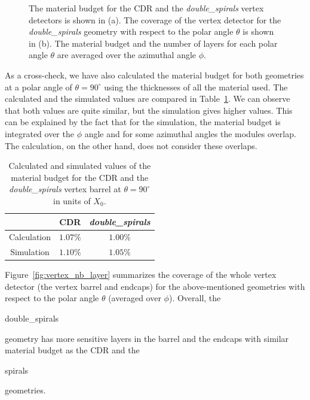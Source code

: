 \begin{figure}[H]
\begin{subfigure}[b]{0.5\textwidth}
    \caption{}\label{fig:double_nb_barrel_endcap}
  \end{subfigure}
  \caption{The material budget for the CDR and the {\it double\_spirals} vertex detectors is shown in (a). The coverage of the vertex detector for the {\it double\_spirals} geometry with respect to the polar angle $\theta$ is shown in (b). The material budget and the number of layers for each polar angle $\theta$ are averaged over the azimuthal angle $\phi$.}
\end{figure}

\newpage
As a cross-check, we have also calculated the material budget for both geometries at a polar angle of $\theta = 90^{\circ}$ using the thicknesses of all the material used. The calculated and the simulated values are compared in Table~\ref{tab:material_budg_DL_table}. We can observe that both values are quite similar, but the simulation gives higher values. This can be explained by the fact that for the simulation, the material budget is integrated over the $\phi$ angle and for some azimuthal angles the modules overlap. The calculation, on the other hand, does not consider these overlaps. 

\begin{table}[H]
  \caption{Calculated and simulated values of the material budget for the CDR and the \textit{double\_spirals} vertex barrel at $\theta = 90^{\circ}$ in units of $X_{0}$.}
  \begin{center}
    \begin{tabular}{ c  c  c } \hline
      & CDR & \textit{double\_spirals} \\  \hline \hline
      Calculation & $1.07\%$ & $1.00\%$ \\ \hline
      Simulation & $1.10\%$ & $1.05\%$ \\ \hline
    \end{tabular}
  \end{center}
  \label{tab:material_budg_DL_table}
\end{table}


Figure~\ref{fig:vertex_nb_layer} summarizes the coverage of the whole vertex detector (the vertex barrel and endcaps) for the above-mentioned geometries with respect to the polar angle $\theta$ (averaged over $\phi$). Overall, the \begin{it}double\_spirals\end{it} geometry has more sensitive layers in the barrel and the endcaps with similar material budget as the CDR and the \begin{it}spirals\end{it} geometries. 


